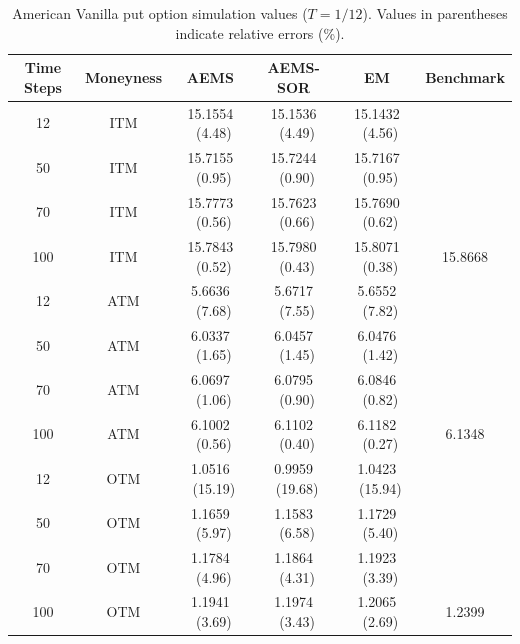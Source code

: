 \documentclass[graybox]{svmult}
\begin{document}
\begin{table}[H]
\centering
\caption{American Vanilla put option simulation values ($T=1/12$). Values in parentheses indicate relative errors (\%).}
\label{tab:OneMonthVanilla}
\setlength{\tabcolsep}{3.4pt} 
\begin{tabular}{c c c c c c}
\toprule
\textbf{Time Steps} & \textbf{Moneyness} & \textbf{AEMS} & \textbf{AEMS-SOR} & \textbf{EM} & \textbf{Benchmark} \\ 
\midrule
12  & ITM & 15.1554 \ (4.48) & 15.1536 \ (4.49) & 15.1432 \ (4.56) &  \\
50  & ITM & 15.7155 \ (0.95) & 15.7244 \ (0.90) & 15.7167 \ (0.95) \\
70  & ITM & 15.7773 \ (0.56) & 15.7623 \ (0.66) & 15.7690 \ (0.62) \\
100 & ITM & 15.7843 \ (0.52) & 15.7980 \ (0.43) & 15.8071 \ (0.38) & 15.8668 \\
\midrule
12  & ATM & \phantom{1}5.6636 \ (7.68) & \phantom{1}5.6717 \ (7.55) & \phantom{1}5.6552 \ (7.82) &  \\
50  & ATM & \phantom{1}6.0337 \ (1.65) & \phantom{1}6.0457 \ (1.45) & \phantom{1}6.0476 \ (1.42) \\
70  & ATM & \phantom{1}6.0697 \ (1.06) & \phantom{1}6.0795 \ (0.90) & \phantom{1}6.0846 \ (0.82) \\
100 & ATM & \phantom{1}6.1002 \ (0.56) & \phantom{1}6.1102 \ (0.40) & \phantom{1}6.1182 \ (0.27) & \phantom{1}6.1348\\
\midrule
12  & OTM & \phantom{1}1.0516 \ (15.19) & \phantom{1}0.9959 \ (19.68) & \phantom{1}1.0423 \ (15.94) &  \\
50  & OTM & \phantom{1}1.1659 \ (5.97)  & \phantom{1}1.1583 \ (6.58)  & \phantom{1}1.1729 \ (5.40) \\
70  & OTM & \phantom{1}1.1784 \ (4.96)  & \phantom{1}1.1864 \ (4.31)  & \phantom{1}1.1923 \ (3.39) \\
100 & OTM & \phantom{1}1.1941 \ (3.69)  & \phantom{1}1.1974 \ (3.43)  & \phantom{1}1.2065 \ (2.69) & \phantom{1}1.2399 \\
\bottomrule
\end{tabular}
\end{table}
\end{document}
